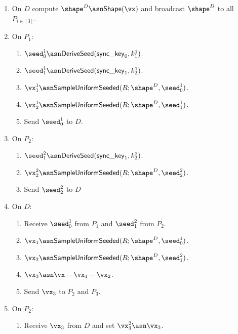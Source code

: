 \begin{enumerate}
      \begin{enumerate}
        \item On $D$ compute $\shape^D \asn \mathsf{Shape}(\vx)$ and broadcast $\shape^D$ to all $P_{i \in [3]}$.

        \item On $P_1$:
        \begin{enumerate}
          \item $\seed_0^1 \asn \mathsf{DeriveSeed}(\mathsf{sync\_key}_0, k_1^1)$.
          \item $\seed_1^1 \asn \mathsf{DeriveSeed}(\mathsf{sync\_key}_1, k_2^1)$.
          \item $\vx_1^1 \asn \mathsf{SampleUniformSeeded}(R; \shape^D, \seed_0^1)$.
          \item $\vx_2^1 \asn \mathsf{SampleUniformSeeded}(R; \shape^D, \seed_1^1)$.
          \item Send $\seed_0^1$ to $D$.
        \end{enumerate}

        \item On $P_2$:
        \begin{enumerate}
          \item $\seed_1^2 \asn \mathsf{DeriveSeed}(\mathsf{sync\_key}_1, k_2^2)$.
          \item $\vx_2^2 \asn \mathsf{SampleUniformSeeded}(R; \shape^D, \seed_2^2)$.
          \item Send $\seed_2^2$ to $D$
        \end{enumerate}

        \item On $D$:
        \begin{enumerate}
          \item Receive $\seed_0^1$ from $P_1$ and $\seed_1^2$ from $P_2$.
          \item $\vx_1 \asn \mathsf{SampleUniformSeeded}(R; \shape^D, \seed_0^1)$.
          \item $\vx_2 \asn \mathsf{SampleUniformSeeded}(R; \shape^D, \seed_1^2)$.
          \item $\vx_3 \asn \vx - \vx_1 - \vx_2$.
          \item Send $\vx_3$ to $P_2$ and $P_3$.
        \end{enumerate}

        \item On $P_2$:
        \begin{enumerate}
          \item Receive $\vx_3$ from $D$ and set $\vx_3^2 \asn \vx_3$.
        \end{enumerate}


\end{enumerate}
\end{enumerate}
